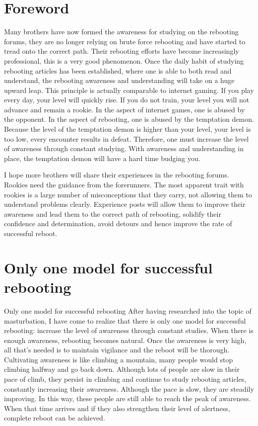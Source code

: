 \documentclass[
]{book}
\begin{document}
\hypertarget{foreword-5}{%
\section{Foreword}\label{foreword-5}}

Many brothers have now formed the awareness for studying on the rebooting forums, they are no longer relying on brute force rebooting and have started to tread onto the correct path. Their rebooting efforts have become increasingly professional, this is a very good phenomenon. Once the daily habit of studying rebooting articles has been established, where one is able to both read and understand, the rebooting awareness and understanding will take on a huge upward leap. This principle is actually comparable to internet gaming. If you play every day, your level will quickly rise. If you do not train, your level you will not advance and remain a rookie. In the aspect of internet games, one is abused by the opponent. In the aspect of rebooting, one is abused by the temptation demon. Because the level of the temptation demon is higher than your level, your level is too low, every encounter results in defeat. Therefore, one must increase the level of awareness through constant studying. With awareness and understanding in place, the temptation demon will have a hard time budging you.

I hope more brothers will share their experiences in the rebooting forums. Rookies need the guidance from the forerunners. The most apparent trait with rookies is a large number of misconceptions that they carry, not allowing them to understand problems clearly. Experience posts will allow them to improve their awareness and lead them to the correct path of rebooting, solidify their confidence and determination, avoid detours and hence improve the rate of successful reboot.

\hypertarget{only-one-model-for-successful-rebooting}{%
\section{Only one model for successful rebooting}\label{only-one-model-for-successful-rebooting}}

Only one model for successful rebooting
After having researched into the topic of masturbation, I have come to realize that there is only one model for successful rebooting: increase the level of awareness through constant studies. When there is enough awareness, rebooting becomes natural. Once the awareness is very high, all that's needed is to maintain vigilance and the reboot will be thorough. Cultivating awareness is like climbing a mountain, many people would stop climbing halfway and go back down. Although lots of people are slow in their pace of climb, they persist in climbing and continue to study rebooting articles, constantly increasing their awareness. Although the pace is slow, they are steadily improving. In this way, these people are still able to reach the peak of awareness. When that time arrives and if they also strengthen their level of alertness, complete reboot can be achieved.
\end{document}
